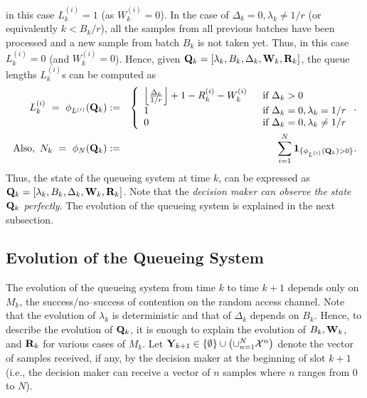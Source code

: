 \documentclass[acmtosn]{acmtrans2m}
\begin{document}
in this case $L_k^{(i)} = 1$ (as $W_k^{(i)} = 0$). In the case of 
$\Delta_k=0,\lambda_k\neq1/r$ (or equivalently $k<B_k/r$), all the samples 
from all previous batches have been processed and a new sample from batch 
$B_k$ is not taken yet. Thus, in this case $L_k^{(i)} = 0$ (and $W_k^{(i)}=0$).   
Hence, given ${\bf Q}_k = \left[\lambda_k, B_k, \Delta_k, {\bf W}_k, {\bf R}_k\right]$,
the queue lengths $L_k^{(i)}$s can be computed as 
\begin{eqnarray}
     \label{eqn:phi-L-m}
     L_k^{(i)} \ = \  \phi_{L^{(i)}}({\bf Q}_k) & := &  
       \left\{
            \begin{array}{ll}
\left\lfloor\frac{\Delta_k}{1/r}\right\rfloor  + 1 - R_k^{(i)} - W_k^{(i)} 
   & \hspace{2mm}\text{if} \ \Delta_k > 0 \\
1  & \hspace{2mm}\text{if} \ \Delta_k = 0, \lambda_k = 1/r \\
0  & \hspace{2mm}\text{if} \ \Delta_k = 0, \lambda_k \neq 1/r 
            \end{array}
\right. .\\
     \label{eqn:phi-n} 
   \text{Also}, \ N_k \ = \ \phi_N({\bf Q}_k) & := & \sum_{i=1}^N {\bf 1}_{\{ \phi_{L^{(i)}}({\bf Q}_k)  > 0\}}. 
     \end{eqnarray}
Thus, the state of the queueing system at time $k$, can be expressed as 
${\bf Q}_k = \left[\lambda_k, B_k, \Delta_k, {\bf W}_k, {\bf R}_k\right]$.
Note that the {\em decision maker can observe the state ${\bf Q}_k$ 
perfectly}. The evolution of the queueing system is explained in the next subsection.

\subsection{Evolution of the Queueing System}
\label{subsec:evol-Q}
The evolution of the queueing system from time $k$ to time $k+1$ depends
only on $M_k$, the success/no--success of contention on the random
access channel. Note that the evolution of $\lambda_k$ is deterministic
and that of $\Delta_k$ depends on $B_k$. Hence, to describe the
evolution of ${\bf Q}_k$, it is enough to explain the evolution of $B_k,
{\bf W}_k$, and ${\bf R}_k$ for various cases of $M_k$. Let ${\bf
Y}_{k+1} \in \{\emptyset\}\cup\left(\cup_{n=1}^N\mathcal{X}^n\right)$
denote the vector of samples received, if any, by the decision maker at
the beginning of slot $k+1$ (i.e., the decision maker can receive a
vector of $n$ samples where $n$ ranges from 0 to $N$).
 
\end{document}
